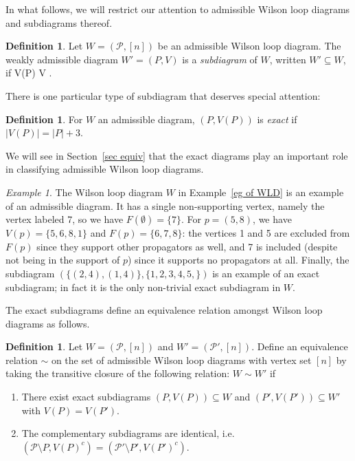 \documentclass[11pt]{article}
\def\bas #1\eas{\begin{align*} #1 \end{align*}}
\newcommand{\cP}{\mathcal{P}}
\theoremstyle{remark}
\newtheorem{eg}[thm]{Example}
\theoremstyle{definition}
\newtheorem{dfn}[thm]{Definition}
\begin{document}
In what follows, we will restrict our attention to admissible Wilson loop diagrams and subdiagrams thereof.

\begin{dfn} \label{subdiagramdfn}
Let $W = (\cP, [n])$ be an admissible Wilson loop diagram. The weakly admissible diagram $W' = (P,V)$ is a {\em subdiagram} of $W$, written $W' \subseteq W$, if \bas P \subseteq \cP {} \quad V(P) \subseteq V \subseteq [n]\;.\eas
\end{dfn}

There is one particular type of subdiagram that deserves special attention:

\begin{dfn}\label{def:exact diagram}
For $W$ an admissible diagram, $(P, V(P))$ is {\em exact} if $|V(P)| = |P| + 3$.
\end{dfn}

We will see in Section~\ref{sec equiv} that the exact diagrams play an important role in classifying admissible Wilson loop diagrams.

\begin{eg}
The Wilson loop diagram $W$ in Example~\ref{eg of WLD} is an example of an admissible diagram. It has a single non-supporting vertex, namely the vertex labeled 7, so we have $F(\emptyset) = \{7\}$. For $p = (5, 8)$, we have $V(p) = \{5,6,8,1\}$ and $F(p) = \{6, 7,8\}$: the vertices 1 and 5 are excluded from $F(p)$ since they support other propagators as well, and 7 is included (despite not being in the support of $p$) since it supports no propagators at all. Finally, the subdiagram $(\{(2, 4), (1, 4)\}, \{1, 2, 3, 4, 5, \})$ is an example of an exact subdiagram; in fact it is the only non-trivial exact subdiagram in $W$.
\end{eg}

The exact subdiagrams define an equivalence relation amongst Wilson loop diagrams as follows.

\begin{dfn}\label{equivdfn} 
Let $W = (\cP,[n])$ and $W' = (\cP',[n])$. Define an equivalence relation $\sim$ on the set of admissible Wilson loop diagrams with vertex set $[n]$ by taking the transitive closure of the following relation: $W \sim W'$ if
\begin{enumerate}
\item There exist exact subdiagrams $(P, V(P)) \subseteq W$ and $(P', V(P')) \subseteq W'$ with $V(P) =  V(P')$.
\item The complementary subdiagrams are identical, i.e. $(\cP \setminus P, V(P)^c) = (\cP' \setminus P', V(P')^c)$.
\end{enumerate}
\end{dfn}
\end{document}
